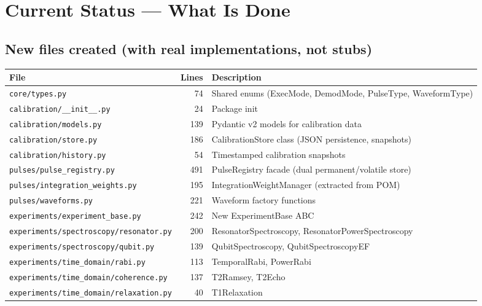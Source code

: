 \documentclass[11pt]{article}
\begin{document}
\section{Current Status --- What Is Done}

\subsection{New files created (with real implementations, not stubs)}

\begin{longtable}{lrl}
\toprule
\textbf{File} & \textbf{Lines} & \textbf{Description} \\
\midrule
\endhead
\texttt{core/types.py}                       &  74 & Shared enums (ExecMode, DemodMode, PulseType, WaveformType) \\
\texttt{calibration/\_\_init\_\_.py}          &  24 & Package init \\
\texttt{calibration/models.py}               & 139 & Pydantic v2 models for calibration data \\
\texttt{calibration/store.py}                & 186 & CalibrationStore class (JSON persistence, snapshots) \\
\texttt{calibration/history.py}              &  54 & Timestamped calibration snapshots \\
\texttt{pulses/pulse\_registry.py}           & 491 & PulseRegistry facade (dual permanent/volatile store) \\
\texttt{pulses/integration\_weights.py}      & 195 & IntegrationWeightManager (extracted from POM) \\
\texttt{pulses/waveforms.py}                 & 221 & Waveform factory functions \\
\texttt{experiments/experiment\_base.py}     & 242 & New ExperimentBase ABC \\
\texttt{experiments/spectroscopy/resonator.py}  & 200 & ResonatorSpectroscopy, ResonatorPowerSpectroscopy \\
\texttt{experiments/spectroscopy/qubit.py}      & 139 & QubitSpectroscopy, QubitSpectroscopyEF \\
\texttt{experiments/time\_domain/rabi.py}       & 113 & TemporalRabi, PowerRabi \\
\texttt{experiments/time\_domain/coherence.py}  & 137 & T2Ramsey, T2Echo \\
\texttt{experiments/time\_domain/relaxation.py} &  40 & T1Relaxation \\

\end{longtable}
\end{document}
